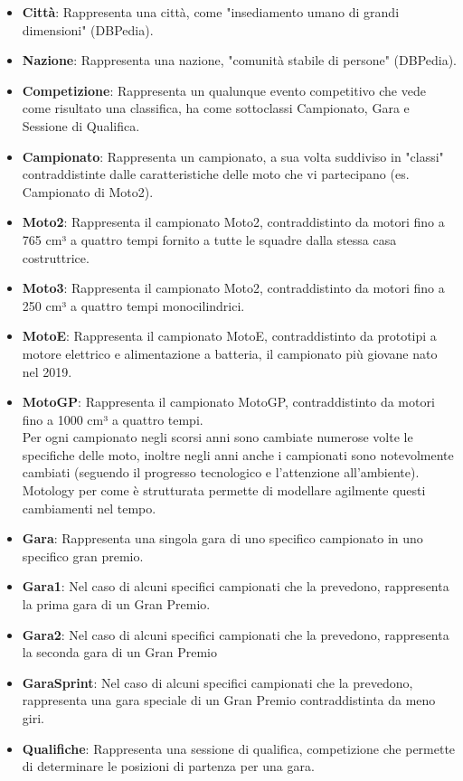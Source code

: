 \begin{itemize}
  \item \textbf{Città}: Rappresenta una città, come "insediamento umano di grandi dimensioni" (DBPedia).
  \item \textbf{Nazione}: Rappresenta una nazione, "comunità stabile di persone" (DBPedia).
  \item \textbf{Competizione}: Rappresenta un qualunque evento competitivo che vede come risultato una classifica, ha come sottoclassi Campionato, Gara e Sessione di Qualifica.
  \item \textbf{Campionato}: Rappresenta un campionato, a sua volta suddiviso in "classi" contraddistinte dalle caratteristiche delle moto che vi partecipano (es. Campionato di Moto2).
  \item \textbf{Moto2}: Rappresenta il campionato Moto2, contraddistinto da motori fino a 765 cm³ a quattro tempi fornito a tutte le squadre dalla stessa casa costruttrice.
  \item \textbf{Moto3}: Rappresenta il campionato Moto2, contraddistinto da motori fino a 250 cm³ a quattro tempi monocilindrici.  
  \item \textbf{MotoE}: Rappresenta il campionato MotoE, contraddistinto da prototipi a motore elettrico e alimentazione a batteria, il campionato più giovane nato nel 2019.
  \item \textbf{MotoGP}: Rappresenta il campionato MotoGP, contraddistinto da motori fino a 1000 cm³ a quattro tempi. \\ Per ogni campionato negli scorsi anni sono cambiate numerose volte le specifiche delle moto, inoltre negli anni anche i campionati sono notevolmente cambiati (seguendo il progresso tecnologico e l'attenzione all'ambiente). Motology per come è strutturata permette di modellare agilmente questi cambiamenti nel tempo.
  \item \textbf{Gara}: Rappresenta una singola gara di uno specifico campionato in uno specifico gran premio.
  \item \textbf{Gara1}: Nel caso di alcuni specifici campionati che la prevedono, rappresenta la prima gara di un Gran Premio.
  \item \textbf{Gara2}: Nel caso di alcuni specifici campionati che la prevedono, rappresenta la seconda gara di un Gran Premio
  \item \textbf{GaraSprint}: Nel caso di alcuni specifici campionati che la prevedono, rappresenta una gara speciale di un Gran Premio contraddistinta da meno giri.
  \item \textbf{Qualifiche}: Rappresenta una sessione di qualifica, competizione che permette di determinare le posizioni di partenza per una gara.

\end{itemize}
